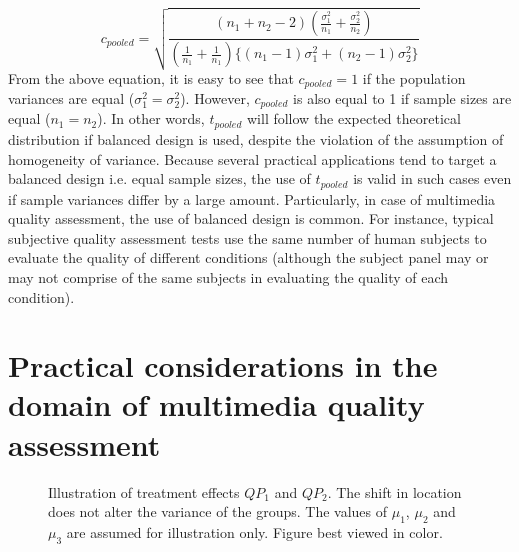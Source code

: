 \documentclass[10pt,final,Twcolumn]{IEEEtran}
\begin{document}
\begin{equation}
c_{pooled} = \sqrt{\frac{\left(n_1+n_2-2\right)\left(\frac{\sigma_1^2}{n_1}+\frac{\sigma_2^2}{n_2} \right)}{\left(\frac{1}{n_1}+\frac{1}{n_1} \right)\{\left( n_1-1\right)\sigma_1^2+\left( n_2-1\right)\sigma_2^2   \}}}
\end{equation}  
From the above equation, it is easy to see that $c_{pooled} =1$ if the population variances are equal ($\sigma_1^2 = \sigma_2^2$). However, $c_{pooled}$ is also equal to 1 if sample sizes are equal ($n_1 = n_2$). In other words, $t_{pooled}$ will follow the expected theoretical distribution if balanced design is used, despite the violation of the assumption of homogeneity of variance. Because several practical applications tend to target a balanced design i.e. equal sample sizes, the use of $t_{pooled}$ is valid in such cases even if sample variances differ by a large amount. Particularly, in case of multimedia quality assessment, the use of balanced design is common. For instance, typical subjective quality assessment tests use the same number of human subjects to evaluate the quality of different conditions (although the subject panel may or may not comprise of the same subjects in evaluating the quality of each condition). 



 
\section{Practical considerations in the domain of multimedia quality assessment} \label{practical considerations}

\begin{figure*}
\centering
\caption{Illustration of treatment effects $QP_1$ and $QP_2$. The shift in location does not alter the variance of the groups. The values of $\mu_1$, $\mu_2$ and $\mu_3$ are assumed for illustration only. Figure best viewed in color.}
\label{hov}
\end{figure*}
\end{document}
